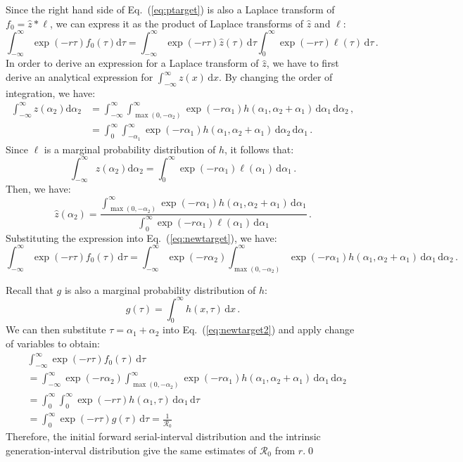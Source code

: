 \documentclass[12pt]{article}
\newcommand{\eref}[1]{Eq.~(\ref{eq:#1})}
\newcommand{\Rx}[1]{\ensuremath{{\mathcal R}_{#1}}\xspace}
\newcommand{\Ro}{\Rx{0}}
\newcommand{\dd}[1]{\ensuremath{\, \mathrm{d}#1}}
\newcommand{\dtau}{\dd{\tau}}
\newcommand{\dx}{\dd{x}}
\newcommand{\pinf}{\ensuremath{\alpha_1}} %
\newcommand{\sinf}{\ensuremath{\alpha_2}} %
\newcommand{\idist}{\ell} %
\begin{document}
Since the right hand side of \eref{ptarget} is also a
Laplace transform of $f_0=\hat{z}*\idist$, we can express it as the product
of Laplace transforms of $\hat{z}$ and $\idist$:
\begin{equation}
\int_{-\infty}^\infty \exp(-r\tau) f_{0}(\tau) \mathrm{d} \tau = \int_{-\infty}^\infty \exp(-r\tau) \hat{z}(\tau)\, \mathrm{d} \tau \int_{0}^\infty \exp(-r\tau) \idist(\tau) \dtau\,.
\label{eq:newtarget}
\end{equation}
In order to derive an expression for a Laplace transform of $\hat{z}$, we have to first derive an analytical expression for $\int_{-\infty}^\infty z(x) \dx$. By changing the order of integration, we have:
\begin{align}
\int_{-\infty}^\infty z(\sinf) \mathrm{d}\sinf &= \int_{-\infty}^\infty \int_{\max{(0,-\sinf)}}^{\infty} \exp(-r\pinf) h(\pinf, \sinf + \pinf)\, \mathrm{d}\pinf \,\mathrm{d}\sinf\nonumber\,,\\
&= \int_{0}^\infty \int_{-\pinf}^\infty \exp(- r \pinf) h(\pinf, \sinf+\pinf)\, \mathrm{d}\sinf\,\mathrm{d} \pinf\,.
\end{align}
Since $\idist$ is a marginal probability distribution of $h$, it follows that:
\begin{equation}
\int_{-\infty}^\infty z(\sinf) \mathrm{d}\sinf = \int_{0}^\infty \exp(- r \pinf) \idist(\pinf)\, \mathrm{d}\pinf\,.
\end{equation}
Then, we have:
\begin{equation}
\hat{z}(\sinf) = \frac{\int_{\max{(0,-\sinf)}}^{\infty} \exp(-r\pinf) h(\pinf, \sinf + \pinf)\, \mathrm{d}\pinf}{\int_{0}^\infty \exp(- r \pinf) \idist(\pinf)\, \mathrm{d}\pinf}\,.
\end{equation}
Substituting the expression into \eref{newtarget}, we have:
\begin{equation}
\int_{-\infty}^\infty \exp(-r\tau) f_{0}(\tau)\dtau = \int_{-\infty}^\infty \exp(-r\sinf) \int_{\max{(0,-\sinf)}}^{\infty} \exp(-r\pinf) h(\pinf, \sinf + \pinf)\, \mathrm{d}\pinf\,\mathrm{d}\sinf\,.
\label{eq:newtarget2}
\end{equation}

Recall that $g$ is also a marginal probability distribution of $h$:
\begin{equation}
g(\tau) = \int_0^\infty h(x, \tau) \,\mathrm{d}x\,.
\end{equation}
We can then substitute $\tau = \pinf + \sinf$ into \eref{newtarget2} and apply change of variables to obtain:
\begin{align}
&\int_{-\infty}^\infty \exp(-r\tau) f_{0}(\tau)\dtau\\
&=\int_{-\infty}^{\infty} \exp(-r\sinf) \int_{\max(0, -\sinf)}^\infty \exp(- r \pinf) h(\pinf, \sinf+\pinf) \,\mathrm{d} \pinf \,\mathrm{d}\sinf \\
&=\int_{0}^{\infty} \int_{0}^\infty \exp(- r \tau) h(\pinf, \tau)\, \mathrm{d} \pinf\, \mathrm{d}\tau\\
&=\int_{0}^{\infty} \exp(-r\tau) g(\tau) \dtau =\frac{1}{\Ro}
\end{align}
Therefore, the initial forward serial-interval distribution and the intrinsic generation-interval distribution give the same estimates of \Ro from $r$.\qed
\end{document}
